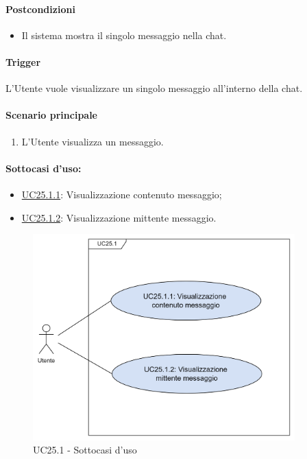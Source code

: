 \paragraph*{Postcondizioni}
\begin{itemize}
  \item Il sistema mostra il singolo messaggio nella chat.
\end{itemize}

\paragraph*{Trigger}
L'Utente vuole visualizzare un singolo messaggio all'interno della chat.

\paragraph*{Scenario principale}
\begin{enumerate}
  \item L'Utente visualizza un messaggio.
\end{enumerate}

\paragraph*{Sottocasi d'uso:}
\begin{itemize}
  \item \hyperref[UC25point1point1]{UC25.1.1}: Visualizzazione contenuto messaggio;
  \item \hyperref[UC25point1point2]{UC25.1.2}: Visualizzazione mittente messaggio.
\end{itemize}

\begin{figure}[H]
  \centering
  \includegraphics[width=0.90\textwidth]{assets/uc25_1_1.png}
  \caption{UC25.1 - Sottocasi d'uso}
\end{figure}

